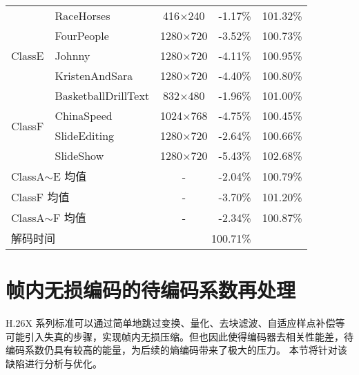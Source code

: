 \begin{table}[!p]
\begin{tabular}{clccc}
                                               & RaceHorses                   & 416$\times$240   & -1.17\%  & 101.32\% \\
        \multirow{3}{*}{ClassE}                & FourPeople                   & 1280$\times$720  & -3.52\%  & 100.73\% \\
                                               & Johnny                       & 1280$\times$720  & -4.11\%  & 100.95\% \\
                                               & KristenAndSara               & 1280$\times$720  & -4.40\%  & 100.80\% \\
        \multirow{4}{*}{ClassF}                & BasketballDrillText          & 832$\times$480   & -1.96\%  & 101.00\% \\
                                               & ChinaSpeed                   & 1024$\times$768  & -4.75\%  & 100.45\% \\
                                               & SlideEditing                 & 1280$\times$720  & -2.64\%  & 100.66\% \\
                                               & SlideShow                    & 1280$\times$720  & -5.43\%  & 102.68\% \\ \midrule
        \multicolumn{2}{l}{ClassA$\sim$E 均值} & -                            & -2.04\%          & 100.79\%            \\ \midrule
        \multicolumn{2}{l}{ClassF 均值}        & -                            & -3.70\%          & 101.20\%            \\ \midrule
        \multicolumn{2}{l}{ClassA$\sim$F 均值} & -                            & -2.34\%          & 100.87\%            \\ \midrule
        \multicolumn{2}{l}{解码时间}           & \multicolumn{3}{c}{100.71\%}                                          \\ \bottomrule
    \end{tabular}
\end{table}

\section{帧内无损编码的待编码系数再处理}
H.26X 系列标准可以通过简单地跳过变换、量化、去块滤波、自适应样点补偿等可能引入失真的步骤，实现帧内无损压缩。但也因此使得编码器去相关性能差，待编码系数仍具有较高的能量，为后续的熵编码带来了极大的压力。
本节将针对该缺陷进行分析与优化。

